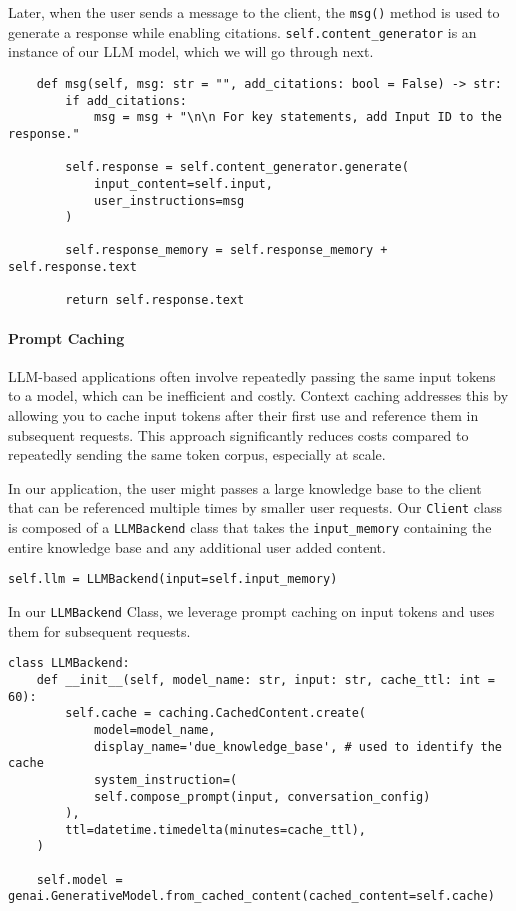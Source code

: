 Later, when the user sends a message to the client, the \texttt{msg()} method is used to generate a response while enabling citations. \texttt{self.content\_generator} is an instance of our LLM model, which we will go through next.

\begin{verbatim}
    def msg(self, msg: str = "", add_citations: bool = False) -> str:
        if add_citations:
            msg = msg + "\n\n For key statements, add Input ID to the response."

        self.response = self.content_generator.generate(
            input_content=self.input,
            user_instructions=msg
        )

        self.response_memory = self.response_memory + self.response.text

        return self.response.text
\end{verbatim}

\paragraph{Prompt Caching}

LLM-based applications often involve repeatedly passing the same input tokens to a model, which can be inefficient and costly. Context caching addresses this by allowing you to cache input tokens after their first use and reference them in subsequent requests. This approach significantly reduces costs compared to repeatedly sending the same token corpus, especially at scale.

In our application, the user might passes a large knowledge base to the client that can be referenced multiple times by smaller user requests. Our \texttt{Client} class is composed of a \texttt{LLMBackend} class that takes the \texttt{input\_memory} containing the entire knowledge base and any additional user added content.

\begin{verbatim}
self.llm = LLMBackend(input=self.input_memory)
\end{verbatim}
In our \texttt{LLMBackend} Class, we leverage prompt caching on input tokens and uses them for subsequent requests.

\begin{verbatim}
class LLMBackend:
    def __init__(self, model_name: str, input: str, cache_ttl: int = 60):
        self.cache = caching.CachedContent.create(
            model=model_name,
            display_name='due_knowledge_base', # used to identify the cache
            system_instruction=(
            self.compose_prompt(input, conversation_config)
        ),
        ttl=datetime.timedelta(minutes=cache_ttl),
    )

    self.model = genai.GenerativeModel.from_cached_content(cached_content=self.cache)
\end{verbatim}

